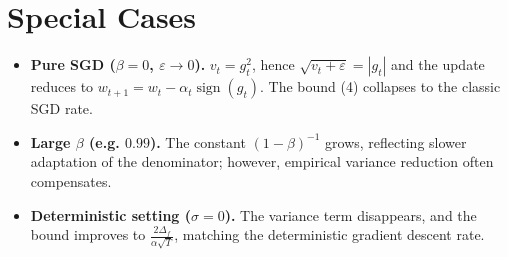 \documentclass{article}
\begin{document}
\section*{Special Cases}
\begin{itemize}
\item \textbf{Pure SGD ($\beta=0$, $\varepsilon\to0$).}
    $v_t=g_t^{2}$, hence $\sqrt{v_t+\varepsilon}=|g_t|$ and the update
    reduces to $w_{t+1}=w_t-\alpha_t\operatorname{sign}(g_t)$.  The bound (4)
    collapses to the classic SGD rate.
\item \textbf{Large $\beta$ (e.g. $0.99$).}
    The constant $(1-\beta)^{-1}$ grows, reflecting slower adaptation of the
    denominator; however, empirical variance reduction often compensates.
\item \textbf{Deterministic setting ($\sigma=0$).}
    The variance term disappears, and the bound improves to
    $\frac{2\Delta_f}{\alpha\sqrt{T}}$, matching the deterministic gradient
    descent rate.
\end{itemize}
\end{document}

